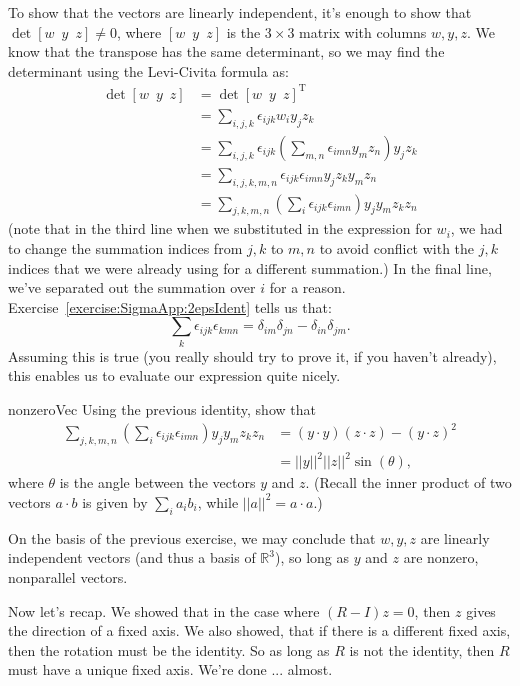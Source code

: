 \begin{itemize}
To show that the vectors are linearly independent, it's enough to show that $\det [w \,\,\, y\,\,\, z] \neq 0$, where $[w \,\,\, y\,\,\, z]$ is the $3 \times 3$ matrix with columns $w, y,z$. We know that the transpose has the same determinant, so we may find the determinant using the Levi-Civita formula as:
\begin{align*}
\det [w \,\,\, y\,\,\, z] &= \det [w \,\,\, y\,\,\, z]^{\text{T}}\\
&= \sum_{i,j,k} \epsilon_{ijk} w_i y_j z_k \\
&= \sum_{i,j,k} \epsilon_{ijk} \left( \sum_{m,n}\epsilon_{imn}y_mz_n \right) y_j z_k \\
&= \sum_{i,j,k,m,n} \epsilon_{ijk} \epsilon_{imn}  y_j z_ky_mz_n \\
&=  \sum_{j,k,m,n} \left( \sum_{i} \epsilon_{ijk} \epsilon_{imn}\right)  y_j y_m z_k z_n
\end{align*}
(note that in the third line when we substituted in the expression for $w_i$, we had to change the summation indices from $j,k$ to $m,n$ to avoid conflict with the $j,k$ indices that we were already using for a different summation.) In the final line, we've separated out the summation over $i$ for a reason.  Exercise~\ref{exercise:SigmaApp:2epsIdent} tells us that:
\[\sum_k \epsilon_{ijk} \epsilon_{kmn} = \delta_{im} \delta_{jn} - \delta_{in} \delta_{jm}. \]
Assuming this is true (you really should try to prove it, if you haven't already), this enables us to evaluate our expression quite nicely.

\begin{exercise}{nonzeroVec}
Using the previous identity, show that 
\begin{align*}
 \sum_{j,k,m,n} \left( \sum_{i} \epsilon_{ijk} \epsilon_{imn}\right)  y_j y_m z_k z_n &= (y \cdot y)(z \cdot z)-(y \cdot z)^2 \\
&= ||y||^2 ||z||^2 \sin(\theta),
\end{align*}
where $\theta$ is the angle between the vectors $y$ and $z$.
(Recall the inner product of two vectors $a \cdot b$ is given by $\sum_i a_i b_i$, while $||a||^2 = a \cdot a$.)
\end{exercise}
On the basis of the previous exercise, we may conclude that $w,y,z$ are linearly independent vectors (and thus a basis of $\mathbb{R}^3$), so long as $y$ and $z$ are nonzero, nonparallel vectors. 

Now let's recap.  We showed that in the case where $(R-I)z = 0$, then $z$ gives the direction of a fixed axis. We also showed, that if there is a different fixed axis, then the rotation must be the identity.  So as long as $R$ is not the identity, then $R$ must have a unique fixed axis. We're done ... almost.
\end{itemize}

